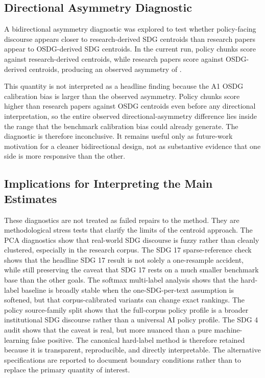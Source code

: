 \documentclass[12pt,a4paper]{article}
\begin{document}
\subsection{Directional Asymmetry Diagnostic}
\label{app:directional-asymmetry}

A bidirectional asymmetry diagnostic was explored to test whether policy-facing discourse appears closer to research-derived SDG centroids than research papers appear to OSDG-derived SDG centroids. In the current run, policy chunks score \HAsymPolicyScore{} against research-derived centroids, while research papers score \HAsymResearchScore{} against OSDG-derived centroids, producing an observed asymmetry of \HAsymGap.

This quantity is not interpreted as a headline finding because the A1 OSDG calibration bias is larger than the observed asymmetry. Policy chunks score \AffFifteenDiff{} higher than research papers against OSDG centroids even before any directional interpretation, so the entire observed directional-asymmetry difference lies inside the range that the benchmark calibration bias could already generate. The diagnostic is therefore inconclusive. It remains useful only as future-work motivation for a cleaner bidirectional design, not as substantive evidence that one side is more responsive than the other.

\subsection{Implications for Interpreting the Main Estimates}

These diagnostics are not treated as failed repairs to the method. They are methodological stress tests that clarify the limits of the centroid approach. The PCA diagnostics show that real-world SDG discourse is fuzzy rather than cleanly clustered, especially in the research corpus. The SDG 17 sparse-reference check shows that the headline SDG 17 result is not solely a one-resample accident, while still preserving the caveat that SDG 17 rests on a much smaller benchmark base than the other goals. The softmax multi-label analysis shows that the hard-label baseline is broadly stable when the one-SDG-per-text assumption is softened, but that corpus-calibrated variants can change exact rankings. The policy source-family split shows that the full-corpus policy profile is a broader institutional SDG discourse rather than a universal AI policy profile. The SDG 4 audit shows that the caveat is real, but more nuanced than a pure machine-learning false positive. The canonical hard-label method is therefore retained because it is transparent, reproducible, and directly interpretable. The alternative specifications are reported to document boundary conditions rather than to replace the primary quantity of interest.
\end{document}
